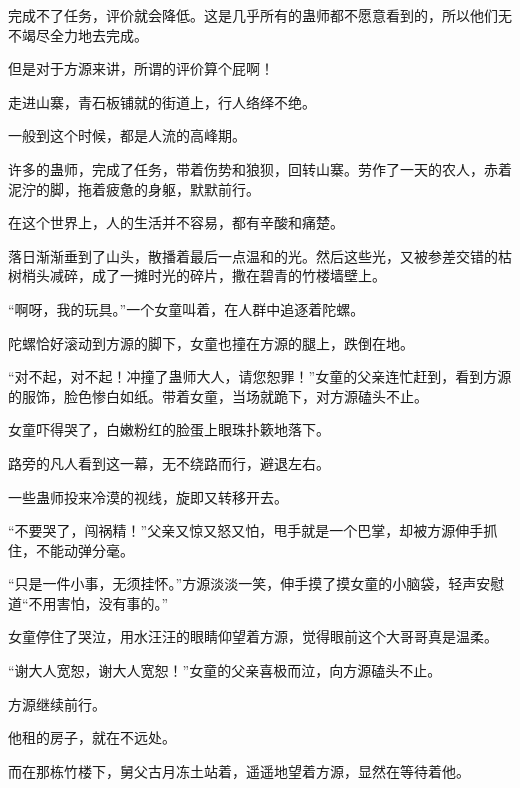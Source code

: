 \begin{this_body}
完成不了任务，评价就会降低。这是几乎所有的蛊师都不愿意看到的，所以他们无不竭尽全力地去完成。

但是对于方源来讲，所谓的评价算个屁啊！

走进山寨，青石板铺就的街道上，行人络绎不绝。

一般到这个时候，都是人流的高峰期。

许多的蛊师，完成了任务，带着伤势和狼狈，回转山寨。劳作了一天的农人，赤着泥泞的脚，拖着疲惫的身躯，默默前行。

在这个世界上，人的生活并不容易，都有辛酸和痛楚。

落日渐渐垂到了山头，散播着最后一点温和的光。然后这些光，又被参差交错的枯树梢头减碎，成了一摊时光的碎片，撒在碧青的竹楼墙壁上。

“啊呀，我的玩具。”一个女童叫着，在人群中追逐着陀螺。

陀螺恰好滚动到方源的脚下，女童也撞在方源的腿上，跌倒在地。

“对不起，对不起！冲撞了蛊师大人，请您恕罪！”女童的父亲连忙赶到，看到方源的服饰，脸色惨白如纸。带着女童，当场就跪下，对方源磕头不止。

女童吓得哭了，白嫩粉红的脸蛋上眼珠扑簌地落下。

路旁的凡人看到这一幕，无不绕路而行，避退左右。

一些蛊师投来冷漠的视线，旋即又转移开去。

“不要哭了，闯祸精！”父亲又惊又怒又怕，甩手就是一个巴掌，却被方源伸手抓住，不能动弹分毫。

“只是一件小事，无须挂怀。”方源淡淡一笑，伸手摸了摸女童的小脑袋，轻声安慰道“不用害怕，没有事的。”

女童停住了哭泣，用水汪汪的眼睛仰望着方源，觉得眼前这个大哥哥真是温柔。

“谢大人宽恕，谢大人宽恕！”女童的父亲喜极而泣，向方源磕头不止。

方源继续前行。

他租的房子，就在不远处。

而在那栋竹楼下，舅父古月冻土站着，遥遥地望着方源，显然在等待着他。

\end{this_body}

